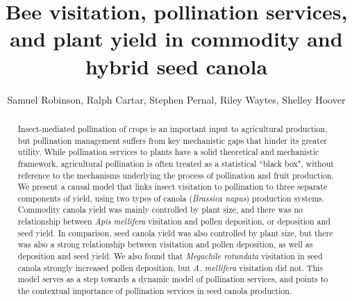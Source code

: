 \documentclass[12pt]{article} %
\title{Bee visitation, pollination services, and plant yield in commodity and hybrid seed canola}
\author{Samuel Robinson, Ralph Cartar, Stephen Pernal, Riley Waytes, Shelley Hoover}
\date{}
\begin{document}
\maketitle
\doublespacing

\begin{abstract}
Insect-mediated pollination of crops is an important input to agricultural production, but pollination management suffers from key mechanistic gaps that hinder its greater utility. 
While pollination services to plants have a solid theoretical and mechanistic framework, agricultural pollination is often treated as a statistical ``black box", without reference to the mechanisms underlying the process of pollination and fruit production.
We present a causal model that links insect visitation to pollination to three separate components of yield, using two types of canola (\textit{Brassica napus}) production systems.
Commodity canola yield was mainly controlled by plant size, and there was no relationship between \textit{Apis mellifera} visitation and pollen deposition, or deposition and seed yield.
In comparison, seed canola yield was also controlled by plant size, but there was also a strong relationship between visitation and pollen deposition, as well as deposition and seed yield.
We also found that \textit{Megachile rotundata} visitation in seed canola strongly increased pollen deposition, but \textit{A. mellifera} visitation did not.
This model serves as a step towards a dynamic model of pollination services, and points to the contextual importance of pollination services in seed canola production.

\end{abstract}

    
\end{document}
